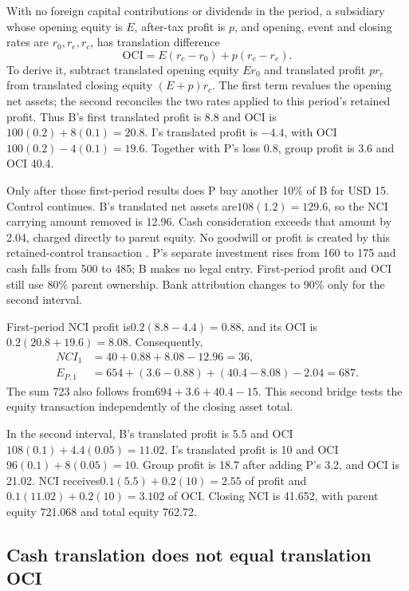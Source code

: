 With no foreign capital contributions or dividends in the period, a subsidiary
whose opening equity is \(E\), after-tax profit is \(p\), and opening,
event and closing rates are \(r_0,r_e,r_c\), has translation difference
\begin{equation}
 \mathrm{OCI}=E(r_c-r_0)+p(r_c-r_e).
 \label{eq:sector-translation-origin}
\end{equation}
To derive it, subtract translated opening equity \(Er_0\) and translated
profit \(pr_e\) from translated closing equity \((E+p)r_c\).
The first term revalues the opening net assets; the second reconciles the
two rates applied to this period's retained profit. Thus B's first translated
profit is 8.8 and OCI is\(100(0.2)+8(0.1)=20.8\). I's translated profit is
\(-4.4\), with OCI\(100(0.2)-4(0.1)=19.6\). Together with P's loss 0.8,
group profit is 3.6 and OCI 40.4.

Only after those first-period results does P buy another 10\% of B for USD 15.
Control continues. B's translated net assets are\(108(1.2)=129.6\), so the
NCI carrying amount removed is 12.96. Cash consideration exceeds that amount
by 2.04, charged directly to parent equity. No goodwill or profit is created
by this retained-control transaction \citep[IFRS~10.23,B 96]{eu 20231803}.
P's separate investment rises from 160 to 175 and cash falls from 500 to 485;
B makes no legal entry. First-period profit and OCI still use 80\% parent
ownership. Bank attribution changes to 90\% only for the second interval.

First-period NCI profit is\(0.2(8.8-4.4)=0.88\), and its OCI is
\(0.2(20.8+19.6)=8.08\). Consequently,
\begin{align}
 NCI_1&=40+0.88+8.08-12.96=36,\\
 E_{P,1}&=654+(3.6-0.88)+(40.4-8.08)-2.04=687.
\end{align}
The sum 723 also follows from\(694+3.6+40.4-15\). This second bridge tests
the equity transaction independently of the closing asset total.

In the second interval, B's translated profit is 5.5 and OCI
\(108(0.1)+4.4(0.05)=11.02\). I's translated profit is 10 and OCI
\(96(0.1)+8(0.05)=10\). Group profit is 18.7 after adding P's 3.2, and
OCI is 21.02. NCI receives\(0.1(5.5)+0.2(10)=2.55\) of profit and
\(0.1(11.02)+0.2(10)=3.102\) of OCI. Closing NCI is 41.652, with parent
equity 721.068 and total equity 762.72.

\subsection{Cash translation does not equal translation OCI}

